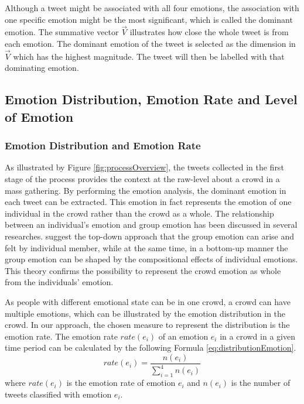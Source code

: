 Although a tweet might be associated with all four emotions, the association with one specific emotion might be the most significant, which is called the dominant emotion. The summative vector \(\vec{V}\) illustrates how close the whole tweet is from each emotion. The dominant emotion of the tweet is selected as the dimension in \(\vec{V}\) which has the highest magnitude. The tweet will then be labelled with that dominating emotion. 

\subsection{Emotion Distribution, Emotion Rate and Level of Emotion}

\subsubsection{Emotion Distribution and Emotion Rate}
As illustrated by Figure \ref{fig:processOverview}, the tweets collected in the first stage of the process provides the context at the raw-level about a crowd in a mass gathering. By performing the emotion analysis, the dominant emotion in each tweet can be extracted. This emotion in fact represents the emotion of one individual in the crowd rather than the crowd as a whole. The relationship between an individual's emotion and group emotion has been discussed in several researches. \citet{barsade1998group} suggest the top-down approach that the group emotion can arise and felt by individual member, while at the same time, in a bottom-up manner the group emotion can be shaped by the compositional effects of individual emotions. This theory confirms the possibility to represent the crowd emotion as whole from the individuals' emotion.

As people with different emotional state can be in one crowd, a crowd can have multiple emotions, which can be illustrated by the emotion distribution in the crowd. In our approach, the chosen measure to represent the distribution is the emotion rate. The emotion rate \(rate(e_i)\) of an emotion \(e_i\) in a crowd in a given time period can be calculated by the following Formula \ref{eq:distributionEmotion}.
\begin{equation}
\label{eq:distributionEmotion}
	rate(e_i) = \frac{n(e_i)}{\sum\limits_{i=1}^4 n(e_i)}
\end{equation}
where \(rate(e_i)\) is the emotion rate of emotion \(e_i\) and \(n(e_i)\) is the number of tweets classified with emotion \(e_i\).

